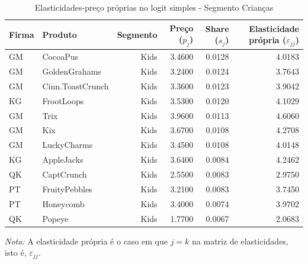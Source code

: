 
\begingroup
\begin{table}[H]
\centering
\caption{Elasticidades-preço próprias no logit simples - Segmento Crianças}
\label{tab:own-elasticities-simple-kids}
\small
\begin{tabular}{llrrrr}
\toprule
Firma & Produto & Segmento & Preço ($p_j$) & Share ($s_j$) & Elasticidade própria ($\varepsilon_{jj}$) \\
\midrule
GM & CocoaPus & Kids & 3.4600 & 0.0128 & 4.0183 \\
GM & GoldenGrahams & Kids & 3.2400 & 0.0124 & 3.7643 \\
GM & Cinn.ToastCrunch & Kids & 3.3600 & 0.0123 & 3.9042 \\
KG & FrootLoops & Kids & 3.5300 & 0.0120 & 4.1029 \\
GM & Trix & Kids & 3.9600 & 0.0113 & 4.6060 \\
GM & Kix & Kids & 3.6700 & 0.0108 & 4.2708 \\
GM & LuckyCharms & Kids & 3.4500 & 0.0108 & 4.0148 \\
KG & AppleJacks & Kids & 3.6400 & 0.0084 & 4.2462 \\
QK & CaptCrunch & Kids & 2.5500 & 0.0083 & 2.9750 \\
PT & FruityPebbles & Kids & 3.2100 & 0.0083 & 3.7450 \\
PT & Honeycomb & Kids & 3.4000 & 0.0074 & 3.9702 \\
QK & Popeye & Kids & 1.7700 & 0.0067 & 2.0683 \\
\bottomrule
\end{tabular}

\vspace{0.3em}
\footnotesize
\textit{Nota:} A elasticidade própria é o caso em que $j=k$ na matriz de elasticidades, isto é, $\varepsilon_{jj}$.
\end{table}
\endgroup

